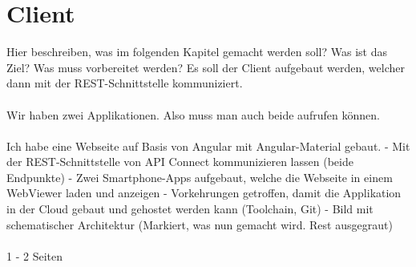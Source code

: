 \chapter{Client}
Hier beschreiben, was im folgenden Kapitel gemacht werden soll? Was ist das Ziel? Was muss vorbereitet werden?
Es soll der Client aufgebaut werden, welcher dann mit der REST-Schnittstelle kommuniziert.
\\ \\
Wir haben zwei Applikationen. Also muss man auch beide aufrufen können.
\\ \\
Ich habe eine Webseite auf Basis von Angular mit Angular-Material gebaut. - Mit der REST-Schnittstelle von API Connect
kommunizieren lassen (beide Endpunkte) - Zwei Smartphone-Apps aufgebaut,
welche die Webseite in einem WebViewer laden und anzeigen - Vorkehrungen getroffen, damit die Applikation in der Cloud
gebaut und gehostet werden kann (Toolchain, Git) - Bild mit schematischer Architektur (Markiert, was nun gemacht wird.
Rest ausgegraut)
\\ \\
1 - 2 Seiten